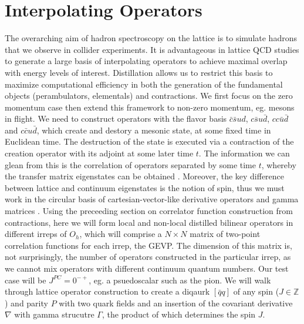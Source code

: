 
\chapter{Interpolating Operators}
\label{sec:ops}

The overarching aim of hadron spectroscopy on the lattice is to simulate hadrons that we observe in collider experiments. It is advantageous in lattice QCD studies to generate a large basis of interpolating operators to achieve maximal overlap with energy levels of interest. Distillation allows us to restrict this basis to maximize computational efficiency in both the generation of the fundamental objects (perambulators, elementals) and contractions. We first focus on the zero momentum case then extend this framework to non-zero momentum, eg. mesons in flight. We need to construct operators with the flavor basis $\bar c\bar s ud$, $c\bar s u\bar d$, $cc\bar u\bar d$ and $c\bar c u\bar d$, which create and destory a mesonic state, at some fixed time in Euclidean time. The destruction of the state is executed via a contraction of the creation operator with its adjoint at some later time $t$.  The information we can glean from this is the correlation of operators separated by some time $t$, whereby the transfer matrix eigenstates can be obtained . Moreover, the key difference between lattice and continuum eigenstates is the notion of spin, thus we must work in the circular basis of cartesian-vector-like derivative operators and gamma matrices \cite{Morningstar:2013bda}. Using the preceeding section on correlator function construction from contractions, here we will form local and non-local distilled bilinear operators in different irreps of $O_h$, which will comprise a $N \times N$ matrix of two-point correlation functions for each irrep, the GEVP. The dimension of this matrix is, not surprisingly, the number of operators constructed in the particular irrep, as we cannot mix operators with different continuum quantum numbers. Our test case will be $J^{PC} =0^{-+}$, eg. a psuedoscalar such as the pion. We will walk through lattice operator construction to create a diqaurk $[\bar{q}q]$ of any spin ($J \in \mathbb{Z}$) and parity $P$ with two quark fields and an insertion of the covariant derivative $\nabla$ with gamma strucutre $\Gamma$, the product of which determines the spin $J$.  
  

